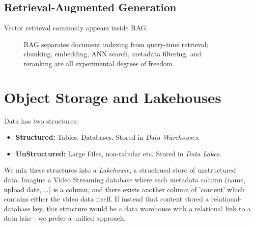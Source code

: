 \subsection{Retrieval-Augmented Generation}
Vector retrieval commonly appears inside RAG.

\begin{figure}[htbp]
\centering
{}
\caption{RAG separates document indexing from query-time retrieval; chunking, embedding, ANN search, metadata filtering, and reranking are all experimental degrees of freedom.}
\label{fig:rag-data-flow}
\end{figure}


\section{Object Storage and Lakehouses}
\label{sec:object-storage}
\label{sec:data-lakes-lakehouses}

Data has two structures:
\begin{itemize}
    \item \textbf{Structured:} Tables, Databases. Stored in \textit{Data Warehouses}. 
    \item \textbf{UnStructured:} Large Files, non-tabular etc. Stored in \textit{Data Lakes}.
\end{itemize}
We mix these structures into a \textit{Lakehouse}, a structrued store of unstructured data. 
Imagine a Video Streaming database where each metadata column (name, upload date, \dots) is a column, and there exists another column of 'content' which contains either the video data itself.
If instead that content stored a relational-database key, this structure would be a data warehouse with a relational link to a data lake - we prefer a unified approach.

